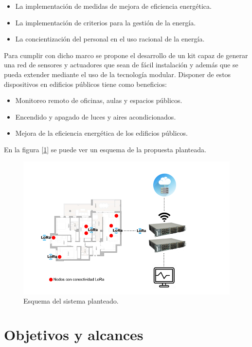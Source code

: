 \begin{itemize}
\item La implementación de medidas de mejora de eficiencia energética.
\item La implementación de criterios para la gestión de la energía.
\item La concientización del personal en el uso racional de la energía.
\end{itemize}

Para cumplir con dicho marco se propone el desarrollo de un kit capaz de generar una red de sensores y actuadores que sean de fácil instalación y además que se pueda extender mediante el uso de la tecnología modular.
Disponer de estos dispositivos en edificios públicos tiene como beneficios:

\begin{itemize}
\item Monitoreo remoto de oficinas, aulas y espacios públicos.
\item Encendido y apagado de luces y aires acondicionados.
\item Mejora de la eficiencia energética de los edificios públicos.
\end{itemize}

En la figura [\ref{fig:esquemaplanteado}] se puede ver un esquema de la propuesta planteada.

\begin{figure}[h]
	\centering
	\includegraphics[width=.80\textwidth]{./Figures/esquemaplanteado.png}
	\caption{Esquema del sistema planteado.}
	\label{fig:esquemaplanteado}
\end{figure}


\section{Objetivos y alcances}
\label{sec:FillingFile}


